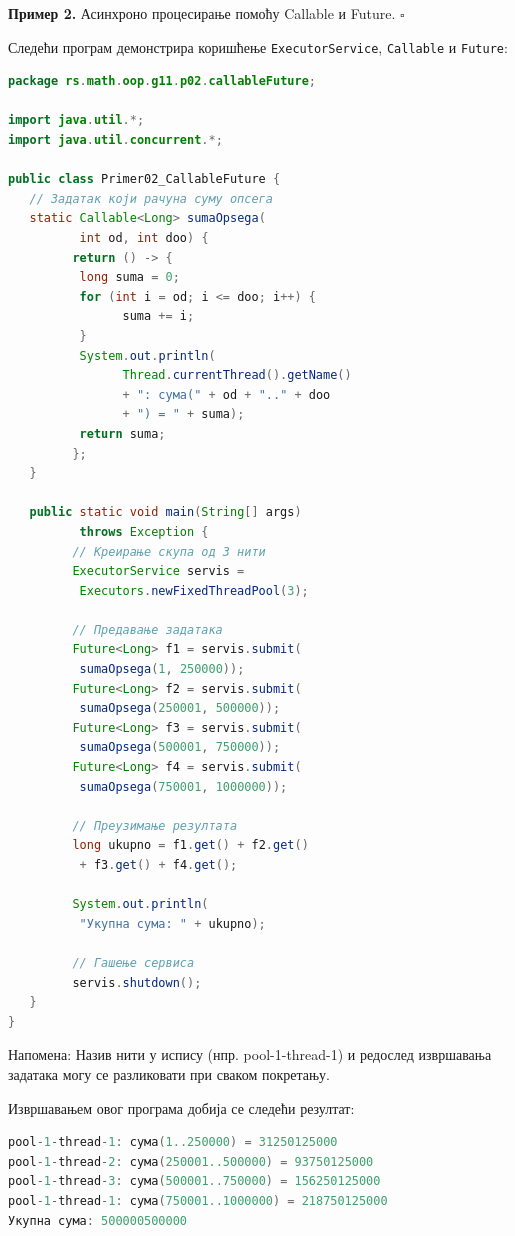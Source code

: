 \bigskip

\noindent \textbf{Пример 2.} Асинхроно процесирање помоћу Callable и Future. $\square$

\medskip

Следећи програм демонстрира коришћење \texttt{ExecutorService}, \texttt{Callable} и \texttt{Future}:


\begin{lstlisting}[language=Java]
package rs.math.oop.g11.p02.callableFuture;
 
import java.util.*;
import java.util.concurrent.*;
 
public class Primer02_CallableFuture {
   // Задатак који рачуна суму опсега
   static Callable<Long> sumaOpsega(
          int od, int doo) {
         return () -> {
          long suma = 0;
          for (int i = od; i <= doo; i++) {
                suma += i;
          }
          System.out.println(
                Thread.currentThread().getName()
                + ": сума(" + od + ".." + doo
                + ") = " + suma);
          return suma;
         };
   }
 
   public static void main(String[] args)
          throws Exception {
         // Креирање скупа од 3 нити
         ExecutorService servis =
          Executors.newFixedThreadPool(3);
 
         // Предавање задатака
         Future<Long> f1 = servis.submit(
          sumaOpsega(1, 250000));
         Future<Long> f2 = servis.submit(
          sumaOpsega(250001, 500000));
         Future<Long> f3 = servis.submit(
          sumaOpsega(500001, 750000));
         Future<Long> f4 = servis.submit(
          sumaOpsega(750001, 1000000));
 
         // Преузимање резултата
         long ukupno = f1.get() + f2.get()
          + f3.get() + f4.get();
 
         System.out.println(
          "Укупна сума: " + ukupno);
 
         // Гашење сервиса
         servis.shutdown();
   }
}
\end{lstlisting}


Напомена: Назив нити у испису (нпр. pool-1-thread-1) и редослед извршавања задатака могу се разликовати при сваком покретању.

Извршавањем овог програма добија се следећи резултат:


\begin{lstlisting}[language=Java]
pool-1-thread-1: сума(1..250000) = 31250125000
pool-1-thread-2: сума(250001..500000) = 93750125000
pool-1-thread-3: сума(500001..750000) = 156250125000
pool-1-thread-1: сума(750001..1000000) = 218750125000
Укупна сума: 500000500000
\end{lstlisting}


